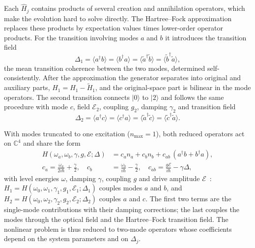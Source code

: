 \documentclass[conference]{IEEEtran}
\newcommand{\cE}{\mathcal{E}}
\newcommand{\ad}{^{\dagger}}
\begin{document}
Each $\widehat H_j$ contains products of several creation and annihilation operators, which make the evolution hard to solve directly. The Hartree--Fock approximation replaces these products by expectation values times lower-order operator products. For the transition involving modes $a$ and $b$ it introduces the transition field
\begin{equation}
\Delta_1=\langle a^\dagger b\rangle=\langle b^\dagger a\rangle=\langle \tilde a^\dagger\tilde b\rangle=\langle \tilde b^\dagger\tilde a\rangle,
\label{eq:Delta1}
\end{equation}
the mean transition coherence between the two modes, determined self-consistently. After the approximation the generator separates into original and auxiliary parts, $\widehat H_1=H_1-\widetilde H_1$, and the original-space part is bilinear in the mode operators. The second transition connects $|0\rangle$ to $|2\rangle$ and follows the same procedure with mode $c$, field $\cE_2$, coupling $g_2$, damping $\gamma_2$ and transition field
\begin{equation}
\Delta_2=\langle a^\dagger c\rangle=\langle c^\dagger a\rangle=\langle \tilde a^\dagger\tilde c\rangle=\langle \tilde c^\dagger\tilde a\rangle .
\label{eq:Delta2}
\end{equation}

With modes truncated to one excitation ($n_{\max}=1$), both reduced operators act on $\mathbb C^4$ and share the form
\begin{align}
H(\omega_a,\omega_b,\gamma,g,\cE;\Delta)&=c_a n_a+c_b n_b+c_{ab}\,(a\ad b+b\ad a),\label{eq:H2mode}\\
c_a=\frac{\omega_a}{2i\hbar}+\frac{\gamma}{2},\quad c_b&=\frac{\omega_b}{i\hbar}-\frac{\gamma}{2},\quad c_{ab}=\frac{g\cE}{i\hbar}-\gamma\Delta,\nonumber
\end{align}
with level energies $\omega$, damping $\gamma$, coupling $g$ and drive amplitude $\cE$~\cite{eleuch2003}: $H_1=H(\omega_0,\omega_1,\gamma_1,g_1,\cE_1;\Delta_1)$ couples modes $a$ and $b$, and $H_2=H(\omega_0,\omega_2,\gamma_2,g_2,\cE_2;\Delta_2)$ couples $a$ and $c$. The first two terms are the single-mode contributions with their damping corrections; the last couples the modes through the optical field and the Hartree--Fock transition field. The nonlinear problem is thus reduced to two-mode operators whose coefficients depend on the system parameters and on $\Delta_j$.
\end{document}
